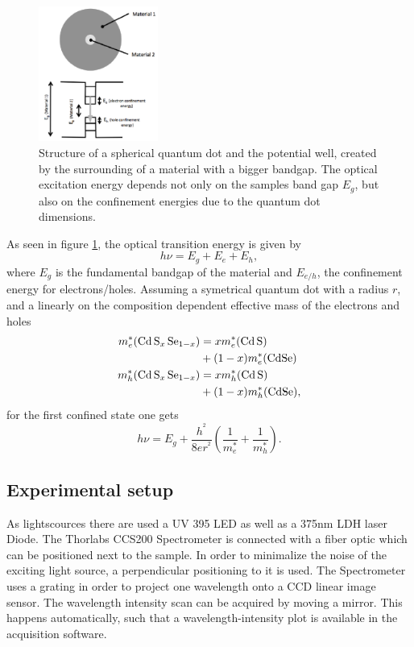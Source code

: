 \begin{figure}
  \centering
  \includegraphics[width=0.35\textwidth]{graphics/QD.png}
  \caption[width=0.4\textwidth]{Structure of a spherical quantum dot and the potential well, created by the surrounding of a material with a bigger bandgap. The optical excitation energy depends not only on the samples band gap $E_g$, but also on the confinement energies due to the quantum dot dimensions\cite{instruction}.}
  \label{fig:QD}
\end{figure}

As seen in figure \ref{fig:QD}, the optical transition energy is given by
\begin{equation}
    h \nu = E_g + E_e + E_h,
\end{equation}
where $E_g$ is the fundamental bandgap of the material and $E_{e/h}$, the confinement energy for electrons/holes.
Assuming a symetrical quantum dot with a radius $r$, and a linearly on the composition dependent effective mass of the electrons and holes
\begin{align*}
m_e^*(\ce{Cd S_x Se_{1-x}}) &= x m_e^*(\ce{Cd S}) \\ &+ (1-x)m_e^* (\ce{CdSe}) \\
m_h^*(\ce{Cd S_x Se_{1-x}}) &= x m_h^*(\ce{Cd S}) \\ &+ (1-x)m_h^* (\ce{CdSe}),
\end{align*}
for the first confined state one gets
\begin{equation}
    h \nu = E_g + \frac{h^^2}{8er^^2}(\frac{1}{m_e^*} + \frac{1}{m_h^*}).
\end{equation}\label{eq:QD}

\subsection{Experimental setup}
\label{sec:setup}

As lightscources there are used a UV 395 LED as well as a 375nm LDH laser Diode.
The Thorlabs CCS200 Spectrometer is connected with a fiber optic which can be positioned next to the sample. 
In order to minimalize the noise of the exciting light source, a perpendicular positioning to it is used.
The Spectrometer uses a grating in order to project one wavelength onto a CCD linear image sensor.
The wavelength intensity scan can be acquired by moving a mirror. This happens automatically, such that a wavelength-intensity plot is available in the acquisition software.

